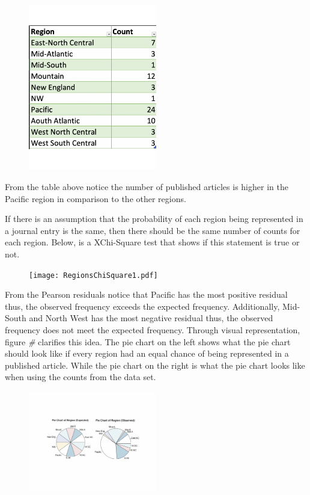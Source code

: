 \documentclass[
]{article}
\begin{document}
\begin{figure}
    \centering
    \includegraphics[width=0.50\textwidth]{RegionsContingencyTable.pdf}
    \label{fig:Contingency Table}
\end{figure}

From the table above notice the number of published articles is higher
in the Pacific region in comparison to the other regions.

If there is an assumption that the probability of each region being
represented in a journal entry is the same, then there should be the
same number of counts for each region. Below, is a XChi-Square test that
shows if this statement is true or not.

\begin{figure}
    \centering
    \texttt{[image: RegionsChiSquare1.pdf]}
    \label{fig:Region XChi-Square}
\end{figure}

From the Pearson residuals notice that Pacific has the most positive
residual thus, the observed frequency exceeds the expected frequency.
Additionally, Mid-South and North West has the most negative residual
thus, the observed frequency does not meet the expected frequency.
Through visual representation, figure \emph{\#} clarifies this idea. The
pie chart on the left shows what the pie chart should look like if every
region had an equal chance of being represented in a published article.
While the pie chart on the right is what the pie chart looks like when
using the counts from the data set.

\begin{figure}
    \centering
    \includegraphics[width=0.50\textwidth]{RegionsPieChart.pdf}
    \label{fig:Region Pie Chart}
\end{figure}
\end{document}
